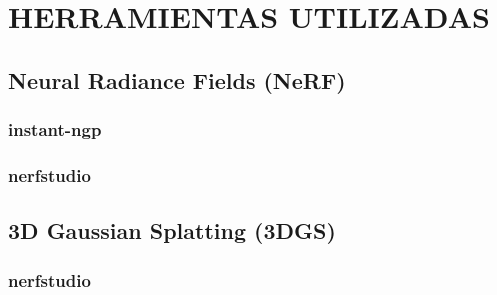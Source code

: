 \documentclass[a4paper, 12pt, spanish, twoside]{article}
\begin{document}

\clearpage





\newpage
\section{HERRAMIENTAS UTILIZADAS} \label{sec:herramientas}


\subsection{Neural Radiance Fields (NeRF)} \label{sec:herramientas:nerf}

\subsubsection{instant-ngp} \label{sec:herramientas:nerf:instant-ngp}

\subsubsection{nerfstudio} \label{sec:herramientas:nerf:nerfstudio}


\subsection{3D Gaussian Splatting (3DGS)} \label{sec:herramientas:3dgs}

\subsubsection{nerfstudio} \label{sec:herramientas:3dgs:nerfstudio}
\end{document}
